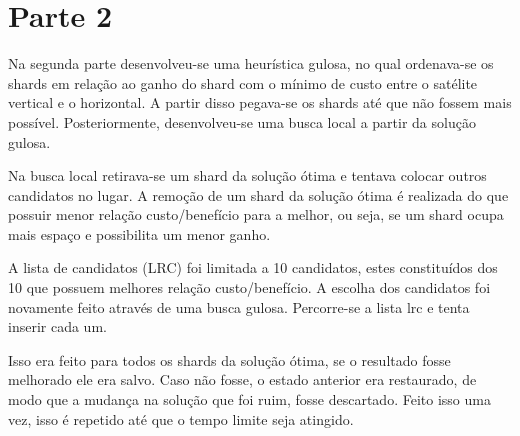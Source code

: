 \documentclass[11pt,letterpaper]{article}
\begin{document}
\addtocounter{footnote}{-3} 
\addtocounter{footnote}{1} 
\addtocounter{footnote}{1} 
\addtocounter{footnote}{1} 
\addtocounter{footnote}{1} 

\section{Parte 2}

Na segunda parte desenvolveu-se uma heurística gulosa, no qual
ordenava-se os shards em relação ao ganho do shard com o mínimo de
custo entre o satélite vertical e o horizontal.
A partir disso pegava-se os shards até que não fossem mais possível.
Posteriormente, desenvolveu-se uma busca local a partir da solução
gulosa.

Na busca local retirava-se um shard da solução ótima e tentava colocar
outros candidatos no lugar. A remoção de um shard da solução ótima é realizada do que possuir
menor relação custo/benefício para a melhor, ou seja, se um shard
ocupa mais espaço e possibilita um menor ganho.

A lista de candidatos (LRC) foi limitada a 10 candidatos, estes
constituídos dos 10 que possuem melhores relação custo/benefício.
A escolha dos candidatos foi novamente feito através de uma busca
gulosa. Percorre-se a lista lrc e tenta inserir cada um.

Isso era feito para todos os shards da solução ótima, se o resultado
fosse melhorado ele era salvo. Caso não fosse, o estado anterior era
restaurado, de modo que a mudança na solução que foi ruim, fosse
descartado. Feito isso uma vez, isso é repetido até
que o tempo limite seja atingido.
\end{document}
